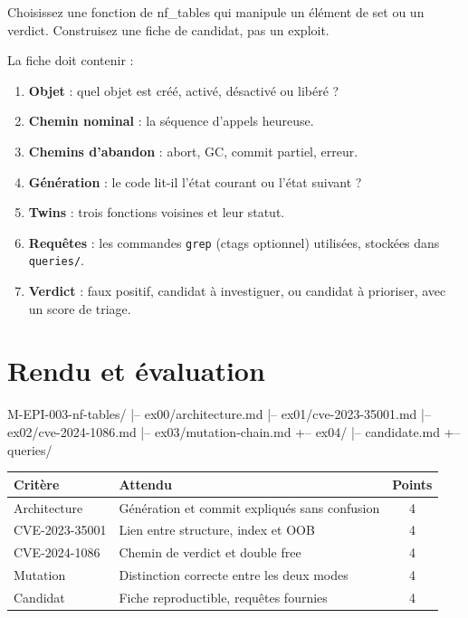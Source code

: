 \documentclass{training}
\begin{document}
Choisissez une fonction de nf\_tables qui manipule un élément de set ou un
verdict. Construisez une fiche de candidat, pas un exploit.

La fiche doit contenir :

\begin{enumerate}
  \item \textbf{Objet} : quel objet est créé, activé, désactivé ou libéré ?
  \item \textbf{Chemin nominal} : la séquence d'appels heureuse.
  \item \textbf{Chemins d'abandon} : abort, GC, commit partiel, erreur.
  \item \textbf{Génération} : le code lit-il l'état courant ou l'état
        suivant ?
  \item \textbf{Twins} : trois fonctions voisines et leur statut.
  \item \textbf{Requêtes} : les commandes \texttt{grep} (ctags optionnel)
        utilisées, stockées dans \texttt{queries/}.
  \item \textbf{Verdict} : faux positif, candidat à investiguer, ou
        candidat à prioriser, avec un score de triage.
\end{enumerate}

\chapter{Rendu et évaluation}

\begin{console}
M-EPI-003-nf-tables/
|-- ex00/architecture.md
|-- ex01/cve-2023-35001.md
|-- ex02/cve-2024-1086.md
|-- ex03/mutation-chain.md
+-- ex04/
    |-- candidate.md
    +-- queries/
\end{console}

\begin{center}
\begin{tabularx}{\linewidth}{|l|X|c|}
\hline
\textbf{Critère} & \textbf{Attendu} & \textbf{Points} \\ \hline
Architecture & Génération et commit expliqués sans confusion & 4 \\ \hline
CVE-2023-35001 & Lien entre structure, index et OOB & 4 \\ \hline
CVE-2024-1086 & Chemin de verdict et double free & 4 \\ \hline
Mutation & Distinction correcte entre les deux modes & 4 \\ \hline
Candidat & Fiche reproductible, requêtes fournies & 4 \\ \hline
\end{tabularx}
\end{center}
\end{document}
